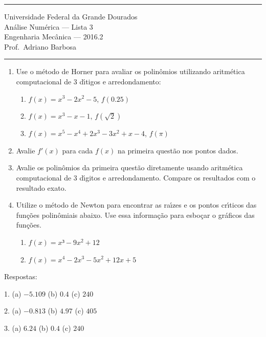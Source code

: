 \documentclass{article}
\begin{document}
\noindent{}\rule{\textwidth}{0.4pt}
\begin{center}
	Universidade Federal da Grande Dourados\\
	An\'alise Num\'erica --- Lista 3 \\
	Engenharia Mec\^anica --- 2016.2 \\
	Prof.\ Adriano Barbosa
\end{center}
\noindent{}\rule{\textwidth}{0.4pt}

\begin{enumerate}
	\item Use o m\'etodo de Horner para avaliar os polin\^omios utilizando
		aritm\'etica computacional de 3 d\'{\i}tigos e arredondamento:
		\begin{enumerate}
			\item $f(x) = x^3 -2x^2 -5$, $f(0.25)$
			\item $f(x) = x^3 - x - 1$, $f(\sqrt{2})$
			\item $f(x) = x^5 - x^4 + 2x^3 - 3x^2 + x - 4$, $f(\pi)$
		\end{enumerate}

	\item Avalie $f'(x)$ para cada $f(x)$ na primeira quest\~ao nos pontos dados.

	\item Avalie os polin\^omios da primeira quest\~ao diretamente usando
		aritm\'etica computacional de 3 d\'{\i}gitos e arredondamento. Compare os
		resultados com o resultado exato.

	\item Utilize o m\'etodo de Newton para encontrar as ra\'{\i}zes e os pontos
		cr\'{\i}ticos das fun\c{c}\~oes polin\^omiais abaixo. Use essa informa\c{c}\~ao para
		esbo\c{c}ar o gr\'aficos das fun\c{c}\~oes.
		\begin{enumerate}
			\item $f(x) = x³ - 9x^2 + 12$
			\item $f(x) = x^4 - 2x^3 - 5x^2 + 12x + 5$
		\end{enumerate}

\end{enumerate}

Respostas:

\noindent{}1. (a) $-5.109$ (b) $0.4$ (c) $240$

\noindent{}2. (a) $-0.813$ (b) $4.97$ (c) $405$

\noindent{}3. (a) $6.24$ (b) $0.4$ (c) $240$
\end{document}
